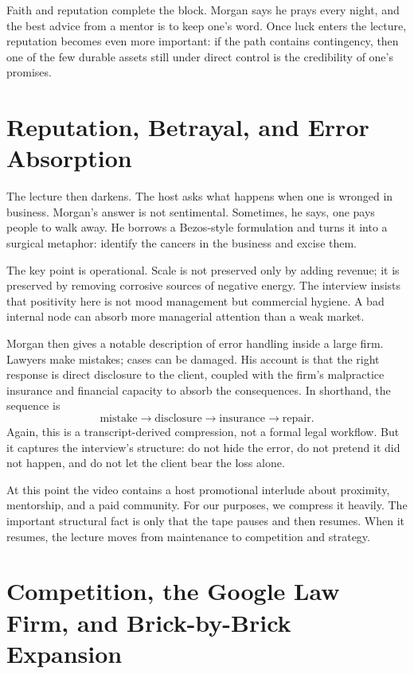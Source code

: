 Faith and reputation complete the block. Morgan says he prays every night, and the best advice from a mentor is to keep one's word. Once luck enters the lecture, reputation becomes even more important: if the path contains contingency, then one of the few durable assets still under direct control is the credibility of one's promises.

\section{Reputation, Betrayal, and Error Absorption}

The lecture then darkens. The host asks what happens when one is wronged in business. Morgan's answer is not sentimental. Sometimes, he says, one pays people to walk away. He borrows a Bezos-style formulation and turns it into a surgical metaphor: identify the cancers in the business and excise them.

The key point is operational. Scale is not preserved only by adding revenue; it is preserved by removing corrosive sources of negative energy. The interview insists that positivity here is not mood management but commercial hygiene. A bad internal node can absorb more managerial attention than a weak market.

Morgan then gives a notable description of error handling inside a large firm. Lawyers make mistakes; cases can be damaged. His account is that the right response is direct disclosure to the client, coupled with the firm's malpractice insurance and financial capacity to absorb the consequences. In shorthand, the sequence is
\begin{equation}
\text{mistake} \to \text{disclosure} \to \text{insurance} \to \text{repair}.
\end{equation}
Again, this is a transcript-derived compression, not a formal legal workflow. But it captures the interview's structure: do not hide the error, do not pretend it did not happen, and do not let the client bear the loss alone.

At this point the video contains a host promotional interlude about proximity, mentorship, and a paid community. For our purposes, we compress it heavily. The important structural fact is only that the tape pauses and then resumes. When it resumes, the lecture moves from maintenance to competition and strategy.

\section{Competition, the Google Law Firm, and Brick-by-Brick Expansion}

